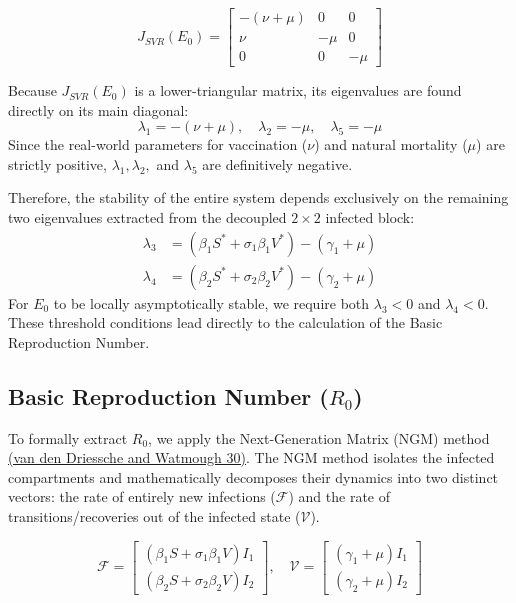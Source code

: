 \documentclass[12pt]{article}
\begin{document}
\begin{equation}
J_{SVR}(E_0) = \begin{bmatrix}
-(\nu + \mu) & 0 & 0 \\
\nu & -\mu & 0 \\
0 & 0 & -\mu
\end{bmatrix}
\end{equation}

Because $J_{SVR}(E_0)$ is a lower-triangular matrix, its eigenvalues are found directly on its main diagonal:
\begin{equation}
\lambda_1 = -(\nu + \mu), \quad \lambda_2 = -\mu, \quad \lambda_5 = -\mu
\end{equation}
Since the real-world parameters for vaccination ($\nu$) and natural mortality ($\mu$) are strictly positive, $\lambda_1, \lambda_2,$ and $\lambda_5$ are definitively negative. 

Therefore, the stability of the entire system depends exclusively on the remaining two eigenvalues extracted from the decoupled $2 \times 2$ infected block:
\begin{align}
\lambda_3 &= (\beta_1 S^* + \sigma_1 \beta_1 V^*) - (\gamma_1 + \mu) \label{eq:lam3} \\
\lambda_4 &= (\beta_2 S^* + \sigma_2 \beta_2 V^*) - (\gamma_2 + \mu) \label{eq:lam4}
\end{align}
For $E_0$ to be locally asymptotically stable, we require both $\lambda_3 < 0$ and $\lambda_4 < 0$. These threshold conditions lead directly to the calculation of the Basic Reproduction Number.

\subsection{Basic Reproduction Number ($R_0$)}
To formally extract $R_0$, we apply the Next-Generation Matrix (NGM) method \hyperref[vandendriessche2002]{(van den Driessche and Watmough 30)}. The NGM method isolates the infected compartments and mathematically decomposes their dynamics into two distinct vectors: the rate of entirely new infections ($\mathcal{F}$) and the rate of transitions/recoveries out of the infected state ($\mathcal{V}$).

\begin{equation}
\mathcal{F} = \begin{bmatrix} (\beta_1 S + \sigma_1 \beta_1 V)I_1 \\ (\beta_2 S + \sigma_2 \beta_2 V)I_2 \end{bmatrix}, \quad
\mathcal{V} = \begin{bmatrix} (\gamma_1 + \mu)I_1 \\ (\gamma_2 + \mu)I_2 \end{bmatrix}
\end{equation}
\end{document}
